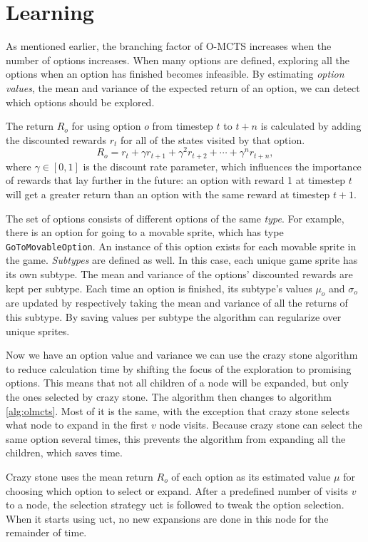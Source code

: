 \section{Learning}
\label{sec:learning}
As mentioned earlier, the branching factor of O-MCTS increases when the number
of options increases. When many options are defined, exploring all the options
when an option has finished becomes infeasible. By estimating
\emph{option values}, the mean and variance of the expected return of an option,
we can detect which options should be explored.

The return $R_o$ for using option $o$ from timestep $t$ to $t+n$ is calculated
by adding the discounted rewards $r_t$ for all of the states visited by that
option.  $$R_o = r_{t} + \gamma r_{t+1} + \gamma^2 r_{t+2} + \cdots + \gamma^n
r_{t+n},$$ where $\gamma \in [0, 1]$ is the discount rate parameter, which
influences the importance of rewards that lay further in the future: an option
with reward 1 at timestep $t$ will get a greater return than an option with the
same reward at timestep $t+1$.  

The set of options consists of different options of the same \emph{type}. For example,
there is an option for going to a movable sprite, which has type
\texttt{GoToMovableOption}. An instance of this option exists for each movable
sprite in the game. \emph{Subtypes} are defined as well. In this case, each
unique game sprite has its own subtype. The mean and variance of the options'
discounted rewards are kept per subtype. Each time an option is finished, its
subtype's values $\mu_o$ and $\sigma_o$ are updated by respectively taking the
mean and variance of all the returns of this subtype. By saving values per
subtype the algorithm can regularize over unique sprites.

Now we have an option value and variance we can use the crazy stone algorithm
to reduce calculation time by shifting the focus of the exploration to promising
options. This means that not all children of a node will be expanded, but only
the ones selected by crazy stone. The algorithm then changes to algorithm
\ref{alg:olmcts}. Most of it is the same, with the exception that crazy stone
selects what node to expand in the first $v$ node visits. Because crazy stone
can select the same option several times, this prevents the algorithm from
expanding all the children, which saves time. 

Crazy stone uses the mean return $R_o$ of each option as its estimated value
$\mu$ for choosing which option to select or expand. After a predefined number
of visits $v$ to a node, the selection strategy \textsf{uct} is followed to
tweak the option selection. When it starts using \textsf{uct}, no new expansions
are done in this node for the remainder of time.

